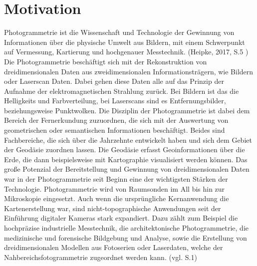 \chapter{Motivation}

Photogrammetrie ist \glqq die Wissenschaft und Technologie der Gewinnung von Informationen
über die physische Umwelt aus Bildern, mit einem Schwerpunkt auf Vermessung,
Kartierung und hochgenauer Messtechnik\grqq{}. (Heipke, 2017, S.5 \cite{photo})  Die Photogrammetrie beschäftigt sich  mit der Rekonstruktion von dreidimensionalen Daten aus zweidimensionalen Informationsträgern, wie Bildern oder Laserscan Daten. Dabei gehen diese Daten alle auf das Prinzip der Aufnahme der elektromagnetischen Strahlung zurück. Bei Bildern ist das die Helligkeits und Farbverteilung, bei Laserscans sind es Entfernungsbilder, beziehungsweise Punktwolken. Die Disziplin der Photogrammetrie ist dabei dem Bereich der Fernerkundung zuzuordnen, die sich mit der Auswertung von geometrischen oder semantischen Informationen beschäftigt. Beides sind Fachbereiche, die sich über die Jahrzehnte entwickelt haben und sich dem Gebiet der Geodäsie zuordnen lassen. Die Geodäsie erfasst Geoinformationen über die Erde, die dann beispielsweise mit Kartographie visualisiert werden können. Das große Potenzial der Bereitstellung und Gewinnung von dreidimensionalen Daten war in der Photogrammetrie seit Beginn eine der wichtigsten Stärken der Technologie. Photogrammetrie wird von Raumsonden im All bis hin zur Mikroskopie eingesetzt. Auch wenn die ursprüngliche Kernanwendung die Kartenerstellung war, sind nicht-topographische Anwendungen seit der Einführung digitaler Kameras stark expandiert. Dazu zählt zum Beispiel die hochpräzise industrielle Messtechnik, die architektonische Photogrammetrie, die medizinische und forensische Bildgebung und Analyse, sowie die Erstellung von dreidimensionalen Modellen aus Fotoserien oder Laserdaten, welche der Nahbereichsfotogrammetrie zugeordnet werden kann. (vgl. \cite{state_of_art} S.1)


